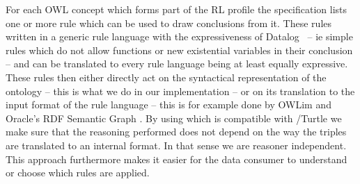 For each OWL concept which forms part of the RL profile the specification lists one or more rule %
which can be used to draw conclusions from it. These rules written in a generic \rdf rule language with the expressiveness of Datalog~\cite{datalog} -- ie simple rules which do not allow functions 
or new existential variables in their conclusion
-- and can be translated to 
every rule language being at least equally expressive. 
These rules then either directly act on the syntactical representation of the ontology -- this is what we do in our implementation -- 
or on its translation to the input format of the rule language -- this is for example done by OWLim \cite{owlim} and Oracle's RDF Semantic Graph \cite{oracle}.
By using \nthree which is compatible with \rdf/Turtle we make sure that the reasoning performed does not depend on the way the triples are translated to an internal format. 
In that sense we are reasoner independent. This approach furthermore makes it easier for the data consumer to understand or choose which rules are applied.  
% 
 
